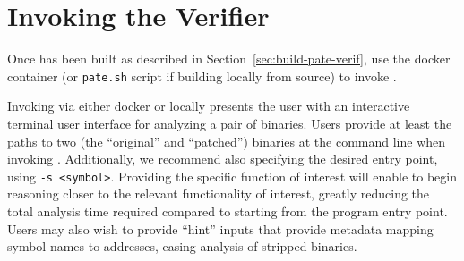
\section{Invoking the \pate{} Verifier}
\label{sec:run-pate-verif}

Once \pate{} has been built as described in Section~\ref{sec:build-pate-verif}, use the docker container (or \texttt{pate.sh} script if building locally from source) to invoke \pate{}.

Invoking \pate{} via either docker or locally presents the user with an interactive terminal user interface for analyzing a pair of binaries.
Users provide at least the paths to two (the ``original'' and ``patched'') binaries at the command line when invoking \pate{}.
Additionally, we recommend also specifying the desired entry point, using \texttt{-s <symbol>}.
Providing the specific function of interest will enable \pate{} to begin reasoning closer to the relevant functionality of interest, greatly reducing the total analysis time required compared to starting from the program entry point.
Users may also wish to provide ``hint'' inputs that provide metadata mapping symbol names to addresses, easing analysis of stripped binaries.

